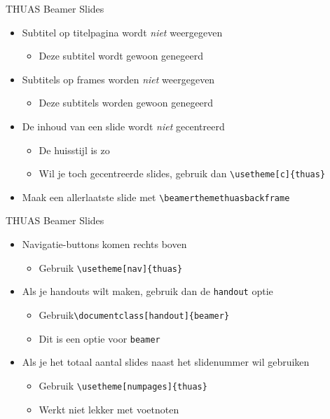 \documentclass[fleqn,aspectratio=169,dutch]{beamer}
\begin{document}
\begin{frame}[fragile]{THUAS Beamer Slides}
\begin{itemize}
\item Subtitel op titelpagina wordt \emph{niet} weergegeven
\begin{itemize}
\item Deze subtitel wordt gewoon genegeerd
\end{itemize}
\item Subtitels op frames worden \emph{niet} weergegeven
\begin{itemize}
\item Deze subtitels worden gewoon genegeerd
\end{itemize}
\item De inhoud van een slide wordt \emph{niet} gecentreerd
\begin{itemize}
\item De huisstijl is zo
\item Wil je toch gecentreerde slides, gebruik dan \lstinline|\usetheme[c]{thuas}|
\end{itemize}
\item Maak een allerlaatste slide met \lstinline|\beamerthemethuasbackframe|
\end{itemize}
\end{frame}

\begin{frame}[fragile]{THUAS Beamer Slides}
\begin{itemize}
\item Navigatie-buttons komen rechts boven
\begin{itemize}
\item Gebruik \lstinline|\usetheme[nav]{thuas}|
\end{itemize}
\item Als je handouts wilt maken, gebruik dan de \lstinline|handout| optie
\begin{itemize}
\item Gebruik\lstinline|\documentclass[handout]{beamer}|
\item Dit is een optie voor \lstinline|beamer|
\end{itemize}
\item Als je het totaal aantal slides naast het slidenummer wil gebruiken
\begin{itemize}
\item Gebruik \lstinline|\usetheme[numpages]{thuas}|
\item Werkt niet lekker met voetnoten
\end{itemize}
\end{itemize}
\end{frame}
\end{document}
